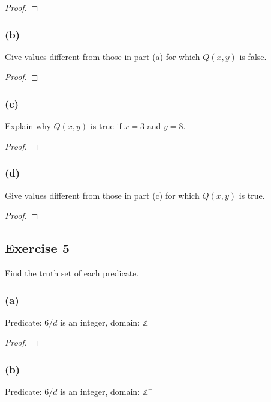 \documentclass[14pt]{extarticle}
\newcommand{\Z}{\mathbb{Z}}
\begin{document}
\begin{proof}

\end{proof}

\subsubsection{(b)}
Give values different from those in part (a) for which $Q(x, y)$ is false.

\begin{proof}

\end{proof}

\subsubsection{(c)}
Explain why $Q(x, y)$ is true if $x = 3$ and $y = 8$.

\begin{proof}

\end{proof}

\subsubsection{(d)}
Give values different from those in part (c) for which $Q(x, y)$ is true.

\begin{proof}

\end{proof}

\subsection{Exercise 5}
Find the truth set of each predicate.

\subsubsection{(a)}
Predicate: $6/d$ is an integer, domain: $\Z$

\begin{proof}

\end{proof}

\subsubsection{(b)}
Predicate: $6/d$ is an integer, domain: $\Z^+$
\end{document}
